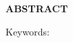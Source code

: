 
\begin{center}

    {\bfseries \hypertarget{abstract}{ABSTRACT} }
    \vspace{1\baselineskip}

\end{center}

    \abstract

    \vspace{1\baselineskip}
    \noindent Keywords: \textit{\keywords}

\clearpage{}